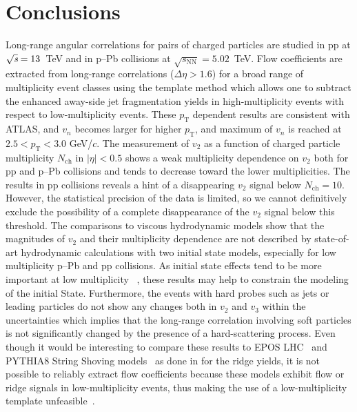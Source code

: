
\section{Conclusions}
\label{sec:summary}
Long-range angular correlations for pairs of charged particles are studied in pp at ${\sqrt{{\textit s}}}=13$~TeV and in p--Pb collisions at $\sqrt{s_\mathrm{NN}} = 5.02$~TeV. Flow coefficients are extracted from long-range correlations ($\Delta\eta > 1.6$) for a broad range of multiplicity event classes using the template  method which allows one to subtract the enhanced away-side jet fragmentation yields in high-multiplicity events with respect to low-multiplicity events.
These $p_\mathrm{T}$ dependent results are consistent with ATLAS, and $v_n$ becomes larger for higher $p_\mathrm{T}$, and maximum of $v_n$ is reached at $2.5<p_\mathrm{T}<3.0$ GeV/$c$. 
The measurement of $v_2$ as a function of charged particle multiplicity $N_{\mathrm{ch}}$ in $|\eta|<0.5$ shows a weak multiplicity dependence on $v_2$ both for pp and p--Pb collisions and tends to decrease toward the lower multiplicities. The results in pp collisions reveals a hint of a disappearing $v_2$ signal below $N_{\mathrm{ch}} = 10$. However, the statistical precision of the data is limited, so we cannot definitively exclude the possibility of a complete disappearance of the $v_2$ signal below this threshold. 
The comparisons to viscous hydrodynamic models show that the magnitudes of $v_2$ and their multiplicity dependence are not described by state-of-art hydrodynamic calculations with two initial state models, especially for low multiplicity p--Pb and pp collisions. As initial state effects tend to be more important at low multiplicity 
~\cite{Greif:2017bnr,Moreland:2018gsh}, these results may help to constrain the modeling of the initial
State.
Furthermore, the events with hard probes such as jets or leading particles do not show any changes both in $v_2$ and $v_3$ within the uncertainties which implies that the long-range correlation involving soft particles is not significantly changed by the presence of a hard-scattering process. 
Even though it would be interesting to compare these results to EPOS LHC~\cite{Pierog:2013ria} and PYTHIA8 String Shoving models~\cite{Bierlich:2017vhg,Bierlich:2019ixq} as done in \cite{ALICE:2012eyl} for the ridge yields, it is not possible to reliably extract flow coefficients because these models exhibit flow or ridge signals in low-multiplicity events, thus making the use of a low-multiplicity template unfeasible~\cite{Ji:2023eqn}.

